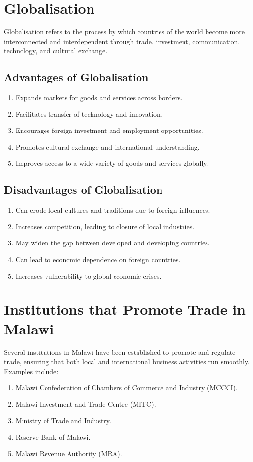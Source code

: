 \documentclass[14pt,a4paper, openany]{book}
\begin{document}
\section{Globalisation}
Globalisation refers to the process by which countries of the world become more interconnected and interdependent
through trade, investment, communication, technology, and cultural exchange.

\subsection{Advantages of Globalisation}
\begin{enumerate}
	\item Expands markets for goods and services across borders.
	\item Facilitates transfer of technology and innovation.
	\item Encourages foreign investment and employment opportunities.
	\item Promotes cultural exchange and international understanding.
	\item Improves access to a wide variety of goods and services globally.
\end{enumerate}

\subsection{Disadvantages of Globalisation}
\begin{enumerate}
	\item Can erode local cultures and traditions due to foreign influences.
	\item Increases competition, leading to closure of local industries.
	\item May widen the gap between developed and developing countries.
	\item Can lead to economic dependence on foreign countries.
	\item Increases vulnerability to global economic crises.
\end{enumerate}

\section{Institutions that Promote Trade in Malawi}
Several institutions in Malawi have been established to promote and regulate trade,
ensuring that both local and international business activities run smoothly.
Examples include:
\begin{enumerate}
	\item Malawi Confederation of Chambers of Commerce and Industry (MCCCI).
	\item Malawi Investment and Trade Centre (MITC).
	\item Ministry of Trade and Industry.
	\item Reserve Bank of Malawi.
	\item Malawi Revenue Authority (MRA).
\end{enumerate}
\end{document}
